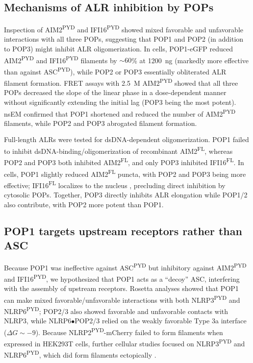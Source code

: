 \documentclass[11pt]{article}
\begin{document}
\subsection{Mechanisms of ALR inhibition by POPs}
Inspection of AIM2\textsuperscript{PYD} and IFI16\textsuperscript{PYD} showed mixed favorable and unfavorable interactions with all three POPs, suggesting that POP1 and POP2 (in addition to POP3) might inhibit ALR oligomerization. In cells, POP1-eGFP reduced AIM2\textsuperscript{PYD} and IFI16\textsuperscript{PYD} filaments by $\sim 60$\% at 1200~ng (markedly more effective than against ASC\textsuperscript{PYD}), while POP2 or POP3 essentially obliterated ALR filament formation. FRET assays with 2.5~\textmu M AIM2\textsuperscript{PYD} showed that all three POPs decreased the slope of the linear phase in a dose-dependent manner without significantly extending the initial lag (POP3 being the most potent). nsEM confirmed that POP1 shortened and reduced the number of AIM2\textsuperscript{PYD} filaments, while POP2 and POP3 abrogated filament formation.

Full-length ALRs were tested for dsDNA-dependent oligomerization. POP1 failed to inhibit dsDNA-binding/oligomerization of recombinant AIM2\textsuperscript{FL}, whereas POP2 and POP3 both inhibited AIM2\textsuperscript{FL}, and only POP3 inhibited IFI16\textsuperscript{FL}. In cells, POP1 slightly reduced AIM2\textsuperscript{FL} puncta, with POP2 and POP3 being more effective; IFI16\textsuperscript{FL} localizes to the nucleus \citep{antiochos2018,kerur2011,li2012}, precluding direct inhibition by cytosolic POPs. Together, POP3 directly inhibits ALR elongation while POP1/2 also contribute, with POP2 more potent than POP1.

\subsection{POP1 targets upstream receptors rather than ASC}
Because POP1 was ineffective against ASC\textsuperscript{PYD} but inhibitory against AIM2\textsuperscript{PYD} and IFI16\textsuperscript{PYD}, we hypothesized that POP1 acts as a ``decoy'' ASC, interfering with the assembly of upstream receptors. Rosetta analyses showed that POP1 can make mixed favorable/unfavorable interactions with both NLRP3\textsuperscript{PYD} and NLRP6\textsuperscript{PYD}; POP2/3 also showed favorable and unfavorable contacts with NLRP3, while NLRP6$\bullet$POP2/3 relied on the weakly favorable Type 3a interface ($\Delta G\sim -9$). Because NLRP2\textsuperscript{PYD}-mCherry failed to form filaments when expressed in HEK293T cells, further cellular studies focused on NLRP3\textsuperscript{PYD} and NLRP6\textsuperscript{PYD}, which did form filaments ectopically \citep{indramohan2018,periasamy2017,ratsimandresy2017}.
\end{document}
